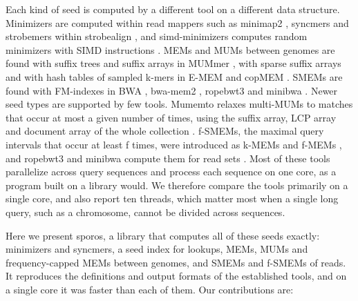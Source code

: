 Each kind of seed is computed by a different tool on a different data structure. Minimizers are computed within read mappers such as minimap2 \citep{Li2018}, syncmers and strobemers within strobealign \citep{Sahlin2021,Sahlin2022}, and simd-minimizers computes random minimizers with SIMD instructions \citep{GrootKoerkamp2025simd}. MEMs and MUMs between genomes are found with suffix trees and suffix arrays in MUMmer \citep{Kurtz2004,Marcais2018}, with sparse suffix arrays \citep{Khan2009,Vyverman2013} and with hash tables of sampled k-mers in E-MEM and copMEM \citep{Khiste2015,Grabowski2019,Grabowski2023}. SMEMs are found with FM-indexes \citep{Ferragina2000} in BWA \citep{Li2013}, bwa-mem2 \citep{Vasimuddin2019}, ropebwt3 \citep{Li2024} and minibwa \citep{Li2026}. Newer seed types are supported by few tools. Mumemto relaxes multi-MUMs to matches that occur at most a given number of times, using the suffix array, LCP array and document array of the whole collection \citep{Shivakumar2025}. f-SMEMs, the maximal query intervals that occur at least f times, were introduced as k-MEMs \citep{Tatarnikov2022} and f-MEMs \citep{Gagie2026}, and ropebwt3 and minibwa compute them for read sets \citep{Li2024,Li2026}. Most of these tools parallelize across query sequences and process each sequence on one core, as a program built on a library would. We therefore compare the tools primarily on a single core, and also report ten threads, which matter most when a single long query, such as a chromosome, cannot be divided across sequences.

Here we present sporos, a library that computes all of these seeds exactly: minimizers and syncmers, a seed index for lookups, MEMs, MUMs and frequency-capped MEMs between genomes, and SMEMs and f-SMEMs of reads. It reproduces the definitions and output formats of the established tools, and on a single core it was faster than each of them. Our contributions are:

